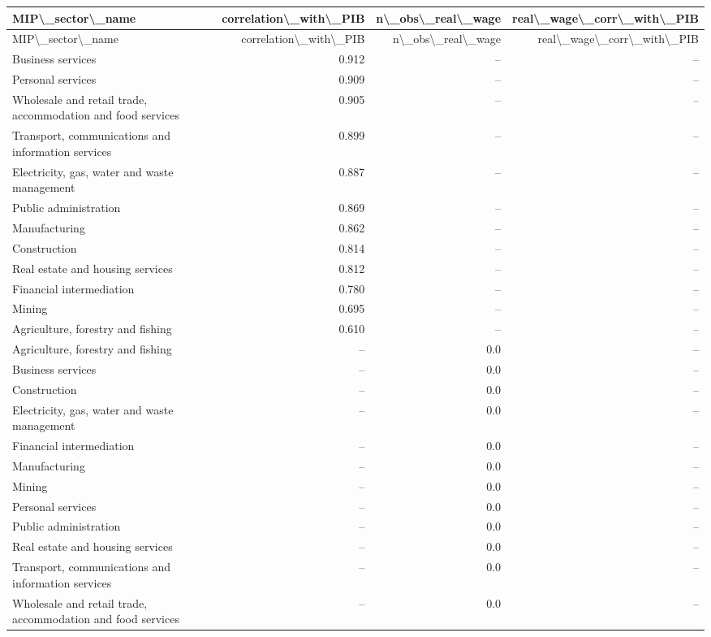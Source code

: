 \begin{longtable}{lrrr}
\hline
MIP\textbackslash{}_sector\textbackslash{}_name & correlation\textbackslash{}_with\textbackslash{}_PIB & n\textbackslash{}_obs\textbackslash{}_real\textbackslash{}_wage & real\textbackslash{}_wage\textbackslash{}_corr\textbackslash{}_with\textbackslash{}_PIB \\ 
\hline\endfirsthead
\hline
MIP\textbackslash{}_sector\textbackslash{}_name & correlation\textbackslash{}_with\textbackslash{}_PIB & n\textbackslash{}_obs\textbackslash{}_real\textbackslash{}_wage & real\textbackslash{}_wage\textbackslash{}_corr\textbackslash{}_with\textbackslash{}_PIB \\ 
\hline\endhead
Business services & 0.912 & -- & -- \\ 
Personal services & 0.909 & -- & -- \\ 
Wholesale and retail trade, accommodation and food services & 0.905 & -- & -- \\ 
Transport, communications and information services & 0.899 & -- & -- \\ 
Electricity, gas, water and waste management & 0.887 & -- & -- \\ 
Public administration & 0.869 & -- & -- \\ 
Manufacturing & 0.862 & -- & -- \\ 
Construction & 0.814 & -- & -- \\ 
Real estate and housing services & 0.812 & -- & -- \\ 
Financial intermediation & 0.780 & -- & -- \\ 
Mining & 0.695 & -- & -- \\ 
Agriculture, forestry and fishing & 0.610 & -- & -- \\ 
Agriculture, forestry and fishing & -- & 0.0 & -- \\ 
Business services & -- & 0.0 & -- \\ 
Construction & -- & 0.0 & -- \\ 
Electricity, gas, water and waste management & -- & 0.0 & -- \\ 
Financial intermediation & -- & 0.0 & -- \\ 
Manufacturing & -- & 0.0 & -- \\ 
Mining & -- & 0.0 & -- \\ 
Personal services & -- & 0.0 & -- \\ 
Public administration & -- & 0.0 & -- \\ 
Real estate and housing services & -- & 0.0 & -- \\ 
Transport, communications and information services & -- & 0.0 & -- \\ 
Wholesale and retail trade, accommodation and food services & -- & 0.0 & -- \\ 
\hline
\end{longtable}
